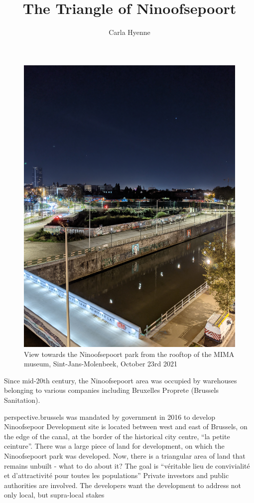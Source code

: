 \documentclass{article}
\title{The Triangle of Ninoofsepoort}
\author{Carla Hyenne}
\begin{document}
\maketitle

\begin{figure}[h!]
	\centering
	\captionsetup{labelformat=empty}
	\includegraphics[width=\textwidth, angle=-90]{bxl_canal_far}
	\caption{View towards the Ninoofsepoort park from the rooftop of the MIMA museum, Sint-Jans-Molenbeek, October 23rd 2021}
\end{figure}

\pagebreak

Since mid-20th century, the Ninoofsepoort area was occupied by warehouses belonging to various companies including Bruxelles Proprete (Brussels Sanitation).

perspective.brussels was mandated by government in 2016 to develop Ninoofsepoor
Development site is located between west and east of Brussels, on the edge of the canal, at the border of the historical city centre, ``la petite ceinture''.
There was a large piece of land for development, on which the Ninoofsepoort park was developed. 
Now, there is a triangular area of land that remains unbuilt - what to do about it? The goal is ``véritable lieu de convivialité et d’attractivité pour toutes les populations'' \cite{perspectiveNinove}
Private investors and public authorities are involved.
The developers want the development to address not only local, but supra-local stakes
\end{document}
